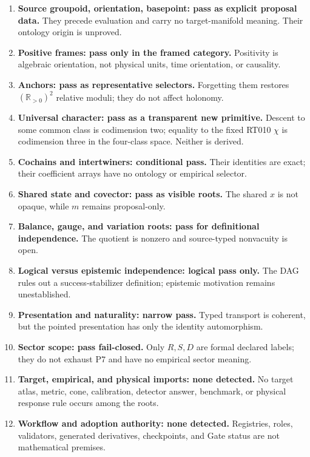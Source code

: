 \documentclass[11pt]{article}
\newcommand{\Rp}{\mathbb{R}_{>0}}
\begin{document}
\begin{enumerate}
\item \textbf{Source groupoid, orientation, basepoint: pass as explicit proposal
data.}  They precede evaluation and carry no target-manifold meaning.  Their
ontology origin is unproved.
\item \textbf{Positive frames: pass only in the framed category.}  Positivity is
algebraic orientation, not physical units, time orientation, or causality.
\item \textbf{Anchors: pass as representative selectors.}  Forgetting them
restores $(\Rp)^2$ relative moduli; they do not affect holonomy.
\item \textbf{Universal character: pass as a transparent new primitive.}
Descent to some common class is codimension two; equality to the fixed RT010
$\chi$ is codimension three in the four-class space.  Neither is derived.
\item \textbf{Cochains and intertwiners: conditional pass.}  Their identities
are exact; their coefficient arrays have no ontology or empirical selector.
\item \textbf{Shared state and covector: pass as visible roots.}  The shared
$x$ is not opaque, while $m$ remains proposal-only.
\item \textbf{Balance, gauge, and variation roots: pass for definitional
independence.}  The quotient is nonzero and source-typed nonvacuity is open.
\item \textbf{Logical versus epistemic independence: logical pass only.}  The
DAG rules out a success-stabilizer definition; epistemic motivation remains
unestablished.
\item \textbf{Presentation and naturality: narrow pass.}  Typed transport is
coherent, but the pointed presentation has only the identity automorphism.
\item \textbf{Sector scope: pass fail-closed.}  Only $R,S,D$ are formal declared
labels; they do not exhaust P7 and have no empirical sector meaning.
\item \textbf{Target, empirical, and physical imports: none detected.}  No
target atlas, metric, cone, calibration, detector answer, benchmark, or physical
response rule occurs among the roots.
\item \textbf{Workflow and adoption authority: none detected.}  Registries,
roles, validators, generated derivatives, checkpoints, and Gate status are not
mathematical premises.
\end{enumerate}
\end{document}
